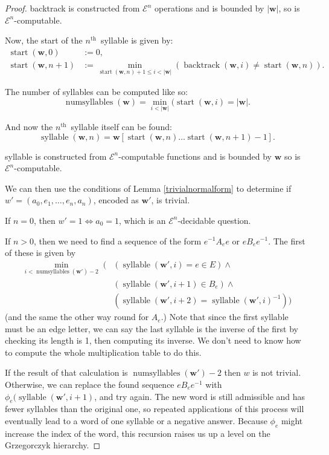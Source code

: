 \documentclass[a4paper]{article}
\newcommand{\grz}[1]{$\mathcal{E}^{#1}$}	%
\newcommand{\nth}{$n^{\textrm{th}}$~}	%
\newcommand{\wvec}{\mathbf{w}}	%
\newcommand{\recur}[1]{\begin{equation} \begin{split} #1 \end{split} \end{equation}}	%
\theoremstyle{plain}
\theoremstyle{definition}
\begin{document}
\begin{proof}
backtrack is constructed from \grz{n} operations and is bounded by $|\wvec|$, so is \grz{n}-computable.

Now, the start of the \nth syllable is given by:
\recur{
\operatorname{start}(\wvec,0) &:= 0, \\
\operatorname{start}(\wvec,n+1) &:= \min_{\operatorname{start}(\wvec,n)+1 \leq i < |\wvec|} (\operatorname{backtrack}(\wvec,i) \neq \operatorname{start}(\wvec,n)).
}

The number of syllables can be computed like so:
\begin{equation} \operatorname{numsyllables}(\wvec) = \min_{i < |\wvec|} ( \operatorname{start}(\wvec,i) = |\wvec|. \end{equation}

And now the \nth syllable itself can be found:
\begin{equation} \operatorname{syllable}(\wvec,n) = \wvec[\operatorname{start}(\wvec,n) \dots \operatorname{start}(\wvec,n+1)-1]. \end{equation}

syllable is constructed from \grz{n}-computable functions and is bounded by $\wvec$ so is \grz{n}-computable.

We can then use the conditions of Lemma \ref{trivialnormalform} to determine if $w' = (a_0,e_1, \dots, e_n, a_n)$, encoded as $\wvec'$, is trivial.

If $n=0$, then $w'=1 \Leftrightarrow a_0=1$, which is an \grz{n}-decidable question.

If $n>0$, then we need to find a sequence of the form $e^{-1}A_ee$ or $eB_ee^{-1}$. The first of these is given by
\begin{equation}
\begin{split}
	\min_{i < \operatorname{numsyllables}(\wvec')-2} \; (&  (\operatorname{syllable}(\wvec',i) = e \in E) \wedge \\ 
	& ( \operatorname{syllable}(\wvec',i+1) \in B_e ) \wedge \\ 
	& ( \operatorname{syllable}(\wvec',i+2) = \operatorname{syllable}(\wvec',i)^{-1} ) )
\end{split} 
\end{equation}
(and the same the other way round for $A_e$.) Note that since the first syllable must be an edge letter, we can say the last syllable is the inverse of the first by checking its length is 1, then computing its inverse. We don't need to know how to compute the whole multiplication table to do this.

If the result of that calculation is $\operatorname{numsyllables}(\wvec')-2$ then $w$ is not trivial. Otherwise, we can replace the found sequence $eB_ee^{-1}$ with $\phi_e(\operatorname{syllable}(\wvec',i+1)$, and try again. The new word is still admissible and has fewer syllables than the original one, so repeated applications of this process will eventually lead to a word of one syllable or a negative answer. Because $\phi_e$ might increase the index of the word, this recursion raises us up a level on the Grzegorczyk hierarchy.


\end{proof}
\end{document}
